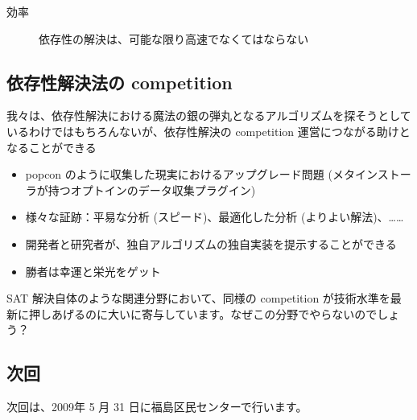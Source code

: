 \documentclass[mingoth,a4paper]{jsarticle}
\begin{document}
\begin{description}
\item[効率] \mbox{}

依存性の解決は、可能な限り高速でなくてはならない
\end{description}


\subsection{依存性解決法の competition}

我々は、依存性解決における魔法の銀の弾丸となるアルゴリズムを探そうとしているわけではもちろんないが、依存性解決の competition 運営につながる助けとなることができる

\begin{itemize}
\item popcon のように収集した現実におけるアップグレード問題 (メタインストーラが持つオプトインのデータ収集プラグイン)
\item 様々な証跡：平易な分析 (スピード)、最適化した分析 (よりよい解法)、……
\item 開発者と研究者が、独自アルゴリズムの独自実装を提示することができる
\item 勝者は幸運と栄光をゲット
\end{itemize}

SAT 解決自体のような関連分野において、同様の competition が技術水準を最新に押しあげるのに大いに寄与しています。なぜこの分野でやらないのでしょう？





\subsection{次回}
次回は、2009年 5 月 31 日に福島区民センターで行います。


\printindex
 \cleartooddpage
\end{document}
